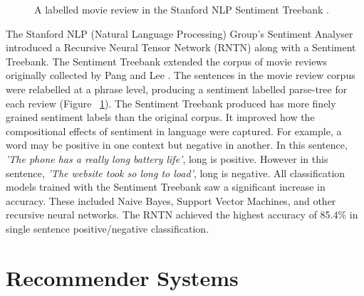 \begin{figure}[h!]
\centering
{}
\caption{\label{fig:treebank} A labelled movie review in the Stanford NLP Sentiment Treebank \cite{stanfordSentiment2013}.}
\end{figure}

The Stanford NLP (Natural Language Processing) Group's Sentiment Analyser \cite{stanfordSentiment2013} introduced a Recursive Neural Tensor Network (RNTN) along with a Sentiment Treebank. The Sentiment Treebank extended the corpus of movie reviews originally collected by Pang and Lee \cite{panglee2004}. The sentences in the movie review corpus were relabelled at a phrase level, producing a sentiment labelled parse-tree for each review (Figure ~\ref{fig:treebank}). The Sentiment Treebank produced has more finely grained sentiment labels than the original corpus. It improved how the compositional effects of sentiment in language were captured. For example, a word may be positive in one context but negative in another. In this sentence, \emph{'The phone has a really long battery life'}, long is positive. However in this sentence, \emph{'The website took so long to load'}, long is negative. All classification models trained with the Sentiment Treebank saw a significant increase in accuracy. These included Naive Bayes, Support Vector Machines, and other recursive neural networks. The RNTN achieved the highest accuracy of 85.4\% in single sentence positive/negative classification.

\section{Recommender Systems}


